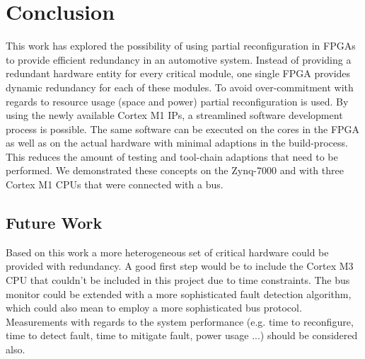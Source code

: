 \section{Conclusion}
This work has explored the possibility of using partial reconfiguration in \glspl{FPGA} to provide efficient redundancy in an automotive system.
Instead of providing a redundant hardware entity for every critical module, one single \gls{FPGA} provides dynamic redundancy for each of these modules.
To avoid over-commitment with regards to resource usage (space and power) partial reconfiguration is used.
By using the newly available Cortex M1 IPs, a streamlined software development process is possible. 
The same software can be executed on the cores in the \gls{FPGA} as well as on the actual hardware with minimal adaptions in the build-process.
This reduces the amount of testing and tool-chain adaptions that need to be performed.
We demonstrated these concepts on the Zynq-7000 and with three Cortex M1 \glspl{CPU} that were connected with a bus.

\subsection{Future Work}
Based on this work a more heterogeneous set of critical hardware could be provided with redundancy. 
A good first step would be to include the Cortex M3 CPU that couldn't be included in this project due to time constraints.
The bus monitor could be extended with a more sophisticated fault detection algorithm, which could also mean to employ a more sophisticated bus protocol.
Measurements with regards to the system performance (e.g. time to reconfigure, time to detect fault, time to mitigate fault, power usage ...) should be considered also.  